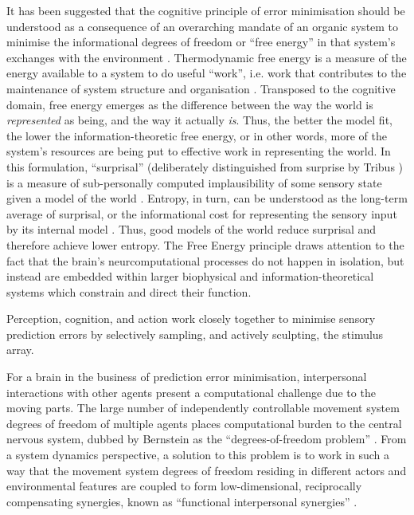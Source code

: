 \begin{CJK}{UTF8}{gbsn}
{
It has been suggested that the cognitive principle of error minimisation should be understood as a consequence of an overarching mandate of an organic system to minimise the informational degrees of freedom or ``free energy'' in that system's exchanges with the environment \citep{Friston2010}.  Thermodynamic free energy is a measure of the energy available to a system to do useful ``work'', i.e. work that contributes to the maintenance of system structure and organisation \citep{Stoner2000}.
Transposed to the cognitive domain, free energy emerges as the difference between the way the world is \textit{represented} as being, and the way it actually \textit{is}.
Thus, the better the model fit, the lower the information-theoretic free energy, or in other words, more of the system's resources are being put to effective work in representing the world.  In this formulation, ``surprisal'' (deliberately distinguished from surprise by Tribus \textcite{Tribus1961}) is a measure of sub-personally computed implausibility of some sensory state given a model of the world \citep{Clark2013}.  Entropy, in turn, can be understood as the long-term average of surprisal, or the informational cost for representing the sensory input by its internal model \citep{Little2013}.  Thus, good models of the world reduce surprisal and therefore achieve lower entropy.  The Free Energy principle draws attention to the fact that the brain's neurcomputational processes do not happen in isolation, but instead are embedded within larger biophysical and information-theoretical systems which constrain and direct their function.


Perception, cognition, and action work closely together to minimise sensory prediction errors by selectively sampling, and actively sculpting, the stimulus array.












For a brain in the business of prediction error minimisation, interpersonal interactions with other agents present a computational challenge due to the moving parts.  The large number of independently controllable movement system degrees of freedom of multiple agents places computational burden to the central nervous system, dubbed by Bernstein \textcite{Bernstein1967} as the ``degrees-of-freedom problem'' \citep[see also][]{Turvey1982,Turvey1990}.  From a system dynamics perspective, a solution to this problem is to work in such a way that the movement system degrees of freedom residing in different actors and environmental features are coupled to form low-dimensional, reciprocally compensating synergies, known as ``functional interpersonal synergies'' \citep{Riley2011}.

}
\end{CJK}

